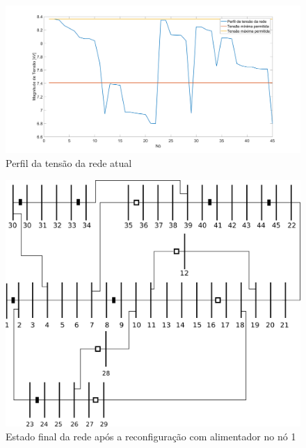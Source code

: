 





\begin{figure}[H]
    \centering
    \includegraphics[width=\textwidth]{01_img/rede_n_otim.png}
    \caption{Perfil da tensão da rede atual}
    \label{fig:voltages_atual}
\end{figure}









\begin{figure}[H]
    \centering
    \includegraphics[width=\textwidth]{01_img/rede_otimizada.png}
    \caption{Estado final da rede após a reconfiguração com alimentador no nó 1}
    \label{fig:rede_otim}
\end{figure}

